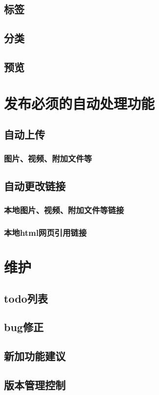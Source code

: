 \documentclass[11pt]{article}
\begin{document}
\subsection{标签}
\label{sec-3-5}
\subsection{分类}
\label{sec-3-6}
\subsection{预览}
\label{sec-3-7}
\section{发布必须的自动处理功能}
\label{sec-4}
\subsection{自动上传}
\label{sec-4-1}
\subsubsection{图片、视频、附加文件等}
\label{sec-4-1-1}
\subsection{自动更改链接}
\label{sec-4-2}
\subsubsection{本地图片、视频、附加文件等链接}
\label{sec-4-2-1}
\subsubsection{本地html网页引用链接}
\label{sec-4-2-2}
\section{维护}
\label{sec-5}
\subsection{todo列表}
\label{sec-5-1}
\subsection{bug修正}
\label{sec-5-2}
\subsection{新加功能建议}
\label{sec-5-3}
\subsection{版本管理控制}
\label{sec-5-4}
\end{document}
